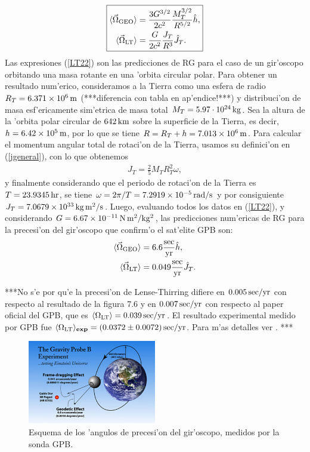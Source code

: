 \begin{equation}\boxed{
\begin{aligned}
\langle\vec{\Omega}_{\rm GEO}\rangle={}&\frac{3G^{3/2}}{2c^2}\frac{M_T^{3/2}}{R^{5/2}}\hat{h},\\
\langle\vec{\Omega}_{\rm LT}\rangle={}&\frac{G}{2c^2}\frac{J_T}{R^3}\hat{J}_T.\label{LT22}
\end{aligned}}
\end{equation}
Las expresiones (\ref{LT22}) son las predicciones de RG para el caso de un gir'oscopo orbitando una masa rotante en una 'orbita circular polar. Para obtener un resultado num'erico, consideramos a la Tierra como una esfera de radio $R_T=6.371\times 10^6\,\rm m$ (***diferencia con tabla en ap'endice!***) y distribuci'on de masa esf'ericamente sim'etrica de masa total $M_T=5.97\cdot 10^{24}\,\rm kg$. Sea la altura de la 'orbita polar circular de $642\,\rm km$ sobre la superficie de la Tierra, es decir, $h=6.42\times 10^5 \,\rm m$, por lo que se tiene $R=R_T+h=7.013\times 10^{6}\,\rm m$. Para calcular el momentum angular total de rotaci'on de la Tierra, usamos su definici'on en (\ref{jgeneral}), con lo que obtenemos
\begin{align}
J_T=\frac{2}{5}M_TR_T^2\omega,
\end{align}
y finalmente considerando que el periodo de rotaci'on de la Tierra es $T=23.9345\,\rm hr$, se tiene $\omega=2\pi/T=7.2919\times 10^{-5}\,\rm rad/s$ y por consiguiente $J_T=7.0679\times 10^{33}\,\rm kg\,m^2/s$.
Luego, evaluando todos los datos en (\ref{LT22}), y considerando $G=6.67\times 10^{-11}\,\rm N\,m^2/kg^2$, las predicciones num'ericas de RG para la precesi'on del gir'oscopo que confirm'o el sat'elite GPB son:
\begin{align}
\langle\vec{\Omega}_{\rm GEO}\rangle={}&6.6{\rm \frac{sec}{yr}}\hat{h},\\
\langle\vec{\Omega}_{\rm LT}\rangle={}&0.049{\rm \frac{sec}{yr}}\hat{J}_T.
\end{align}

***No s'e por qu'e la precesi'on de Lense-Thirring difiere en $0.005\,\rm sec/yr$ con respecto al resultado de la figura 7.6 y en $0.007\,\rm sec/yr$ con respecto al paper oficial del GPB, que es $\langle\Omega_{\rm LT}\rangle=0.039\,\rm sec/yr$. El resultado experimental medido por GPB fue $\langle\Omega_{\rm LT}{}\rangle_{\rm\bf exp}=(0.0372\pm 0.0072)\,\rm sec/yr$. Para m'as detalles ver \cite{Everitt11}. ***

\begin{figure}[H]
\centering
\includegraphics[angle=0,width=0.5\textwidth]{fig/fig-precesion.pdf}
\caption{Esquema de los 'angulos de precesi'on del gir'oscopo, medidos por la sonda GPB.}
\label{precesion}
\end{figure}